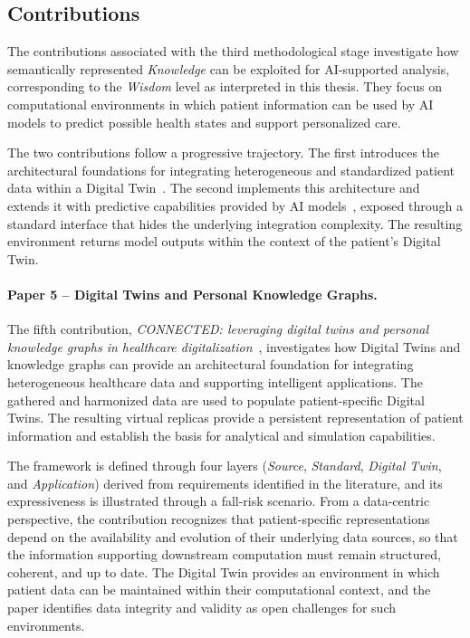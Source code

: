 \subsection{Contributions}
\label{subsec:inference_contributions}

The contributions associated with the third methodological stage investigate how semantically represented \emph{Knowledge} can be exploited for AI-supported analysis, corresponding to the \emph{Wisdom} level as interpreted in this thesis. They focus on computational environments in which patient information can be used by AI models to predict possible health states and support personalized care.

The two contributions follow a progressive trajectory. The first introduces the architectural foundations for integrating heterogeneous and standardized patient data within a Digital Twin~\cite{10.3389/fdgth.2023.1322428_carbonaro_connected}. The second implements this architecture and extends it with predictive capabilities provided by AI models~\cite{MARFOGLIA2026108380}, exposed through a standard interface that hides the underlying integration complexity. The resulting environment returns model outputs within the context of the patient's Digital Twin.

\paragraph{Paper 5 -- Digital Twins and Personal Knowledge Graphs.}
The fifth contribution, \emph{CONNECTED: leveraging digital twins and personal knowledge graphs in healthcare digitalization}~\cite{10.3389/fdgth.2023.1322428_carbonaro_connected}, investigates how Digital Twins and knowledge graphs can provide an architectural foundation for integrating heterogeneous healthcare data and supporting intelligent applications. The gathered and harmonized data are used to populate patient-specific Digital Twins. The resulting virtual replicas provide a persistent representation of patient information and establish the basis for analytical and simulation capabilities.

The framework is defined through four layers (\emph{Source}, \emph{Standard}, \emph{Digital Twin}, and \emph{Application}) derived from requirements identified in the literature, and its expressiveness is illustrated through a fall-risk scenario. From a data-centric perspective, the contribution recognizes that patient-specific representations depend on the availability and evolution of their underlying data sources, so that the information supporting downstream computation must remain structured, coherent, and up to date. The Digital Twin provides an environment in which patient data can be maintained within their computational context, and the paper identifies data integrity and validity as open challenges for such environments.

